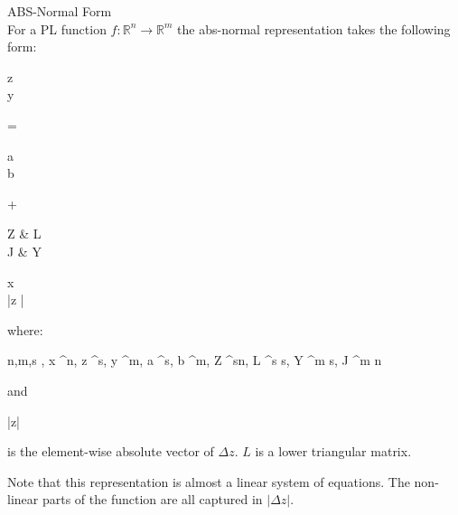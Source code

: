 \begin{mydef*}
	ABS-Normal Form \\
	For a PL function $f:\mathbb{R}^n \rightarrow \mathbb{R}^m$ the abs-normal representation takes the following form:
	\begin{flalign} \label{absnf}
	\begin{pmatrix}
	\Delta z \\
	\Delta y
	\end{pmatrix}
	= 
	\begin{pmatrix}
	a \\
	b
	\end{pmatrix}
	+
	\begin{pmatrix}
	Z & L \\
	J & Y 
	\end{pmatrix}
	\times
	\begin{pmatrix}
	\Delta x \\
	|\Delta z |
	\end{pmatrix}
	\end{flalign}
	where:
	\begin{flalign*}
		n,m,s \in {}, \Delta x \in {}^n, \Delta z \in {}^s, \Delta y \in {}^m, a \in {}^s, b \in {}^{m}, Z \in {}^{s\times n}, L \in {}^{s \times s}, Y \in {}^{m \times s}, J \in {}^{m \times n}
	\end{flalign*}
	and 
	\begin{flalign*}
		|\Delta z|
	\end{flalign*}
	is the element-wise absolute vector of $\Delta z$. $L$ is a lower triangular matrix.
\end{mydef*}
Note that this representation is almost a linear system of equations. The non-linear parts of the function are all captured in $|\Delta z|$.

